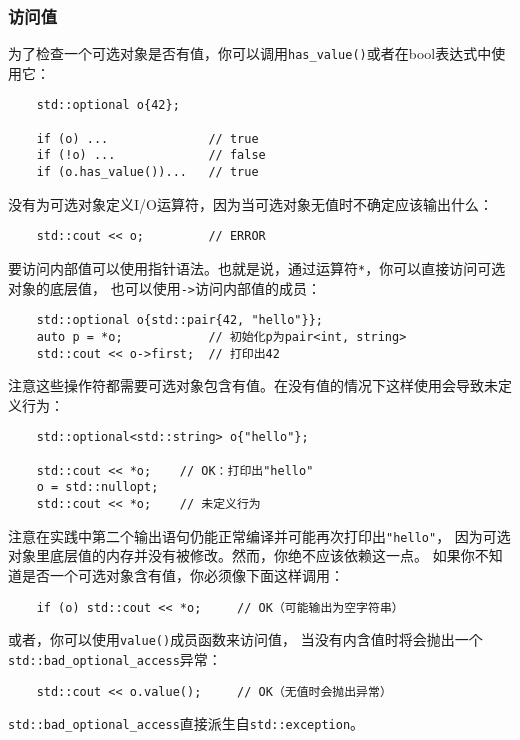 \subsubsection*{访问值}
为了检查一个可选对象是否有值，你可以调用\texttt{has\_value()}或者在bool表达式中使用它：
\begin{lstlisting}
    std::optional o{42};

    if (o) ...              // true
    if (!o) ...             // false
    if (o.has_value())...   // true
\end{lstlisting}
没有为可选对象定义I/O运算符，因为当可选对象无值时不确定应该输出什么：
\begin{lstlisting}
    std::cout << o;         // ERROR
\end{lstlisting}
要访问内部值可以使用指针语法。也就是说，通过运算符\texttt{*}，你可以直接访问可选对象的底层值，
也可以使用\texttt{->}访问内部值的成员：
\begin{lstlisting}
    std::optional o{std::pair{42, "hello"}};
    auto p = *o;            // 初始化p为pair<int, string>
    std::cout << o->first;  // 打印出42
\end{lstlisting}
注意这些操作符都需要可选对象包含有值。在没有值的情况下这样使用会导致未定义行为：
\begin{lstlisting}
    std::optional<std::string> o{"hello"};

    std::cout << *o;    // OK：打印出"hello"
    o = std::nullopt;
    std::cout << *o;    // 未定义行为
\end{lstlisting}
注意在实践中第二个输出语句仍能正常编译并可能再次打印出\texttt{"hello"}，
因为可选对象里底层值的内存并没有被修改。然而，你绝不应该依赖这一点。
如果你不知道是否一个可选对象含有值，你必须像下面这样调用：
\begin{lstlisting}
    if (o) std::cout << *o;     // OK（可能输出为空字符串）
\end{lstlisting}
或者，你可以使用\texttt{value()}成员函数来访问值，
当没有内含值时将会抛出一个\texttt{std::bad\_optional\_access}异常：
\begin{lstlisting}
    std::cout << o.value();     // OK（无值时会抛出异常）
\end{lstlisting}
\texttt{std::bad\_optional\_access}直接派生自\texttt{std::exception}。

